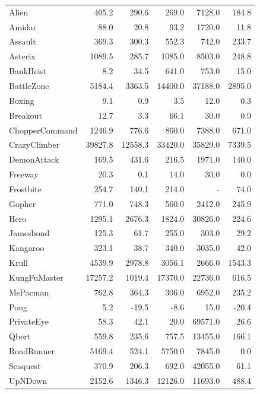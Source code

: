 \begin{table}
\begin{tabular}{lrrrrr}
\midrule
Alien          &    405.2 &    290.6 &    269.0 &   7128.0 &   184.8 \\
Amidar         &     88.0 &     20.8 &     93.2 &   1720.0 &    11.8 \\
Assault        &    369.3 &    300.3 &    552.3 &    742.0 &   233.7 \\
Asterix        &   1089.5 &    285.7 &   1085.0 &   8503.0 &   248.8 \\
BankHeist      &      8.2 &     34.5 &    641.0 &    753.0 &    15.0 \\
BattleZone     &   5184.4 &   3363.5 &  14400.0 &  37188.0 &  2895.0 \\
Boxing         &      9.1 &      0.9 &      3.5 &     12.0 &     0.3 \\
Breakout       &     12.7 &      3.3 &     66.1 &     30.0 &     0.9 \\
ChopperCommand &   1246.9 &    776.6 &    860.0 &   7388.0 &   671.0 \\
CrazyClimber   &  39827.8 &  12558.3 &  33420.0 &  35829.0 &  7339.5 \\
DemonAttack    &    169.5 &    431.6 &    216.5 &   1971.0 &   140.0 \\
Freeway        &     20.3 &      0.1 &     14.0 &     30.0 &     0.0 \\
Frostbite      &    254.7 &    140.1 &    214.0 &      - &    74.0 \\
Gopher         &    771.0 &    748.3 &    560.0 &   2412.0 &   245.9 \\
Hero           &   1295.1 &   2676.3 &   1824.0 &  30826.0 &   224.6 \\
Jamesbond      &    125.3 &     61.7 &    255.0 &    303.0 &    29.2 \\
Kangaroo       &    323.1 &     38.7 &    340.0 &   3035.0 &    42.0 \\
Krull          &   4539.9 &   2978.8 &   3056.1 &   2666.0 &  1543.3 \\
KungFuMaster   &  17257.2 &   1019.4 &  17370.0 &  22736.0 &   616.5 \\
MsPacman       &    762.8 &    364.3 &    306.0 &   6952.0 &   235.2 \\
Pong           &      5.2 &    -19.5 &     -8.6 &     15.0 &   -20.4 \\
PrivateEye     &     58.3 &     42.1 &     20.0 &  69571.0 &    26.6 \\
Qbert          &    559.8 &    235.6 &    757.5 &  13455.0 &   166.1 \\
RoadRunner     &   5169.4 &    524.1 &   5750.0 &   7845.0 &     0.0 \\
Seaquest       &    370.9 &    206.3 &    692.0 &  42055.0 &    61.1 \\
UpNDown        &   2152.6 &   1346.3 &  12126.0 &  11693.0 &   488.4 \\
\bottomrule
\end{tabular}
\label{tab:shortNumericalResults}
\end{table}
\fi


